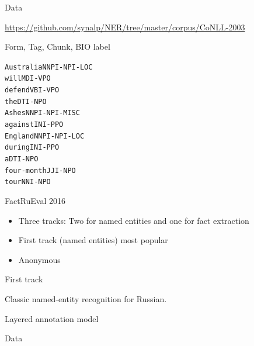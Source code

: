 \documentclass[10pt, compress]{beamer}
\begin{document}
\begin{frame}{Data}

\begin{center}
\url{https://github.com/synalp/NER/tree/master/corpus/CoNLL-2003}
\end{center}

Form, Tag, Chunk, BIO label

\begin{alltt}

Australia NNP I-NP I-LOC  \\ 
will MD I-VP O \\ 
defend VB I-VP O \\ 
the DT I-NP O \\ 
Ashes NNP I-NP I-MISC \\ 
against IN I-PP O \\
England NNP I-NP I-LOC \\
during IN I-PP O \\ 
a DT I-NP O \\ 
four-month JJ I-NP O \\ 
tour NN I-NP O \\ 

\end{alltt}

\end{frame}

\begin{frame}{FactRuEval 2016}

\begin{itemize}
  \item Three tracks: Two for named entities and one for fact extraction
  \item First track (named entities) most popular
  \item Anonymous
\end{itemize}

\end{frame}

\begin{frame}{First track}

Classic named-entity recognition for Russian.

\end{frame}


\begin{frame}{Layered annotation model}


\end{frame}

\begin{frame}{Data}

\end{frame}
\end{document}
